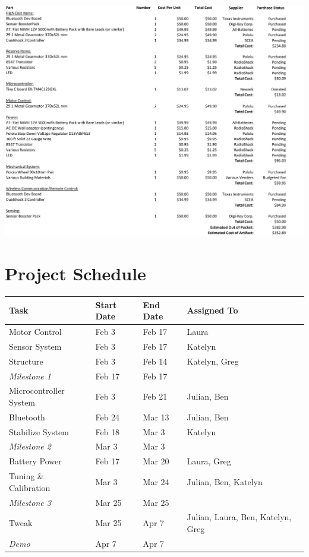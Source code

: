 \documentclass[11pt]{report}
\begin{document}
\begin{spacing}{1.5}
    {
    \centering
    \includegraphics[width=\textwidth]{CostAccounting}
    }

\section*{Project Schedule} %

\begin{table}[H]
\begin{tabular}{lllll}

\toprule
Task & Start Date & End Date & Assigned To \\
\midrule
Motor Control & Feb 3 & Feb 17 & Laura \\
Sensor System &	Feb 3 &	Feb 17 &			Katelyn \\
Structure	& Feb 3	& Feb 14 &			Katelyn, Greg \\
\textit{Milestone 1}	& Feb 17 &	Feb 17		\\		
Microcontroller System	& Feb 3	& Feb 21 &	 Julian, Ben \\
Bluetooth	& Feb 24 & 	Mar 13	& 	Julian, Ben \\
Stabilize System	& Feb 18	& Mar 3	 	& Katelyn \\
\textit{Milestone 2} &	Mar 3 &	Mar 3	 \\			
Battery Power	& Feb 17 &	Mar 20 &	 Laura, Greg \\
Tuning \& Calibration	& Mar 3	& Mar 24 &		Julian, Ben, Katelyn \\
\textit{Milestone 3}	& Mar 25	& Mar 25				 \\
Tweak	& Mar 25 &	Apr 7 &	Julian, Laura, Ben, Katelyn, Greg \\
\textit{Demo} & Apr 7 & Apr 7 \\				
\bottomrule


\end{tabular}
\end{table}
\end{spacing}
\end{document}
